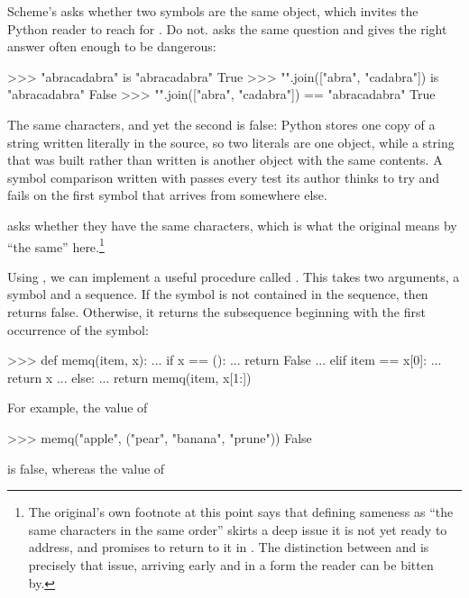 \begin{revealTheSurface}
Scheme's  asks whether two symbols are the same object, which invites
the Python reader to reach for .  Do not.   asks the same
question and gives the right answer often enough to be dangerous:

\begin{codeBlock}
>>> "abracadabra" is "abracadabra"
True
>>> "".join(["abra", "cadabra"]) is "abracadabra"
False
>>> "".join(["abra", "cadabra"]) == "abracadabra"
True
\end{codeBlock}

\noindent
The same characters, and yet the second is false: Python stores one copy of a
string written literally in the source, so two literals are one object, while a
string that was built rather than written is another object with the same
contents.  A symbol comparison written with  passes every test its
author thinks to try and fails on the first symbol that arrives from somewhere
else.

\code{==} asks whether they have the same characters, which is what the
original means by ``the same'' here.\footnote{The original's own footnote at
this point says that defining sameness as ``the same characters in the same
order'' skirts a deep issue it is not yet ready to address, and promises to
return to it in .  The distinction between \code{==} and
 is precisely that issue, arriving early and in a form the reader can
be bitten by.}
\end{revealTheSurface}

Using \code{==}, we can implement a useful procedure called .  This
takes two arguments, a symbol and a sequence.  If the symbol is not contained
in the sequence, then  returns false.  Otherwise, it returns the
subsequence beginning with the first occurrence of the symbol:

\begin{codeBlock}
>>> def memq(item, x):
...     if x == ():
...         return False
...     elif item == x[0]:
...         return x
...     else:
...         return memq(item, x[1:])
\end{codeBlock}

\noindent
For example, the value of

\begin{codeBlock}
>>> memq("apple", ("pear", "banana", "prune"))
False
\end{codeBlock}

\noindent
is false, whereas the value of

